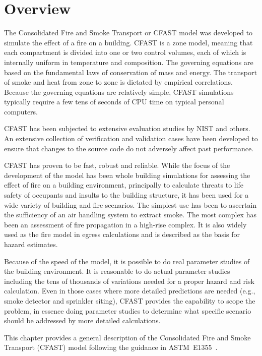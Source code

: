 \chapter{Overview}

The Consolidated Fire and Smoke Transport or CFAST model was developed to simulate the effect of a fire on a building. CFAST is a zone model, meaning that each compartment is divided into one or two control volumes, each of which is internally uniform in temperature and composition. The governing equations are based on the fundamental laws of conservation of mass and energy. The transport of smoke and heat from zone to zone is dictated by empirical correlations. Because the governing equations are relatively simple, CFAST simulations typically require a few tens of seconds of CPU time on typical personal computers. 

CFAST has been subjected to extensive evaluation studies by NIST and others. An extensive collection of verification and validation cases have been developed to ensure that changes to the source code do not adversely affect past performance. 

CFAST has proven to be fast, robust and reliable. While the focus of the development of the model has been whole building simulations for assessing the effect of fire on a building environment, principally to calculate threats to life safety of occupants and insults to the building structure, it has been used for a wide variety of building and fire scenarios. The simplest use has been to ascertain the sufficiency of an air handling system to extract smoke. The most complex has been an assessment of fire propagation in a high-rise complex. It is also widely used as the fire model in egress calculations and is described as the basis for hazard estimates.

Because of the speed of the model, it is possible to do real parameter studies of the building environment. It is reasonable to do actual parameter studies including the tens of thousands of variations needed for a proper hazard and risk calculation. Even in those cases where more detailed predictions are needed (e.g., smoke detector and sprinkler siting), CFAST provides the capability to scope the problem, in essence doing parameter studies to determine what specific scenario should be addressed by more detailed calculations.

This chapter provides a general description of the Consolidated Fire and Smoke Transport (CFAST) model following the guidance in ASTM~E1355~\cite{ASTM:E1355}.

